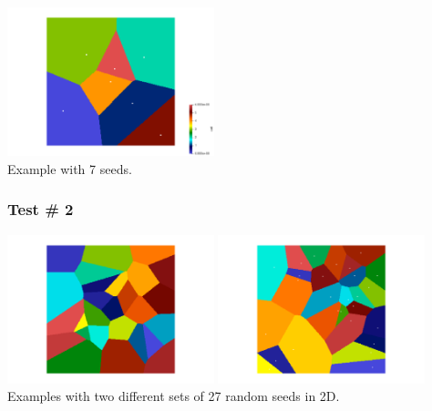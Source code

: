\begin{center}
\includegraphics[width=6cm]{python_codes/fieldstone_125/results/diagram.png}\\
{\captionfont Example with 7 seeds.}
\end{center}


\subsubsection*{Test \# 2}

\begin{center}
\includegraphics[width=6cm]{python_codes/fieldstone_125/results/test2_a}
\includegraphics[width=6cm]{python_codes/fieldstone_125/results/test2_b}\\
{\captionfont Examples with two different sets of 27 random seeds in 2D.}
\end{center}

